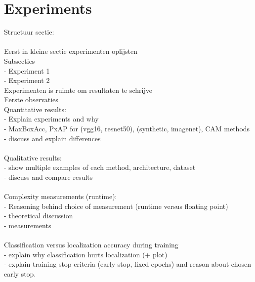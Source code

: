 \chapter{Experiments}

Structuur sectie: \\\\
Eerst in kleine sectie experimenten oplijsten \\
Subsecties \\
- Experiment 1 \\
- Experiment 2 \\
Experimenten is ruimte om resultaten te schrijve \\
Eerste observaties \\


Quantitative results:\\
- Explain experiments and why\\
- MaxBoxAcc, PxAP for (vgg16, resnet50), (synthetic, imagenet), CAM methods\\
- discuss and explain differences\\
\\
Qualitative results:\\
- show multiple examples of each method, architecture, dataset\\
- discuss and compare results\\
\\
Complexity measurements (runtime):\\
- Reasoning behind choice of measurement (runtime versus floating point)\\
- theoretical discussion\\
- measurements\\
\\
Classification versus localization accuracy during training\\
- explain why classification hurts localization (+ plot)\\
- explain training stop criteria (early stop, fixed epochs) and reason about chosen early stop.\\
